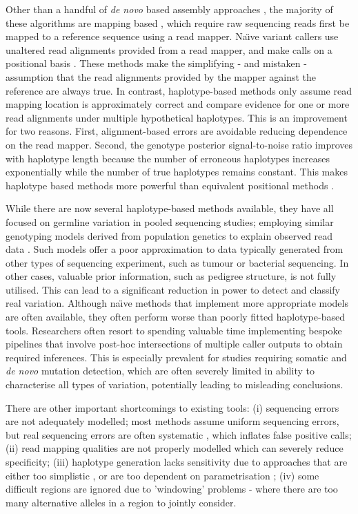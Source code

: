 \documentclass[notitlepage, twocolumn]{article}
\begin{document}
Other than a handful of \emph{de novo} based assembly approaches \cite{cortex}, the majority of these algorithms are mapping based \cite{gatk, freebayes, platypus}, which require raw sequencing reads first be mapped to a reference sequence using a read mapper. Na\"\i ve variant callers use unaltered read alignments provided from a read mapper, and make calls on a positional basis \cite{samtools}. These methods make the simplifying - and mistaken - assumption that the read alignments provided by the mapper against the reference are always true. In contrast, haplotype-based methods only assume read mapping location is approximately correct and compare evidence for one or more read alignments under multiple hypothetical haplotypes. This is an improvement for two reasons. First, alignment-based errors are avoidable reducing dependence on the read mapper. Second, the genotype posterior signal-to-noise ratio improves with haplotype length because the number of erroneous haplotypes increases exponentially while the number of true haplotypes remains constant. This makes haplotype based methods more powerful than equivalent positional methods \cite{haplotype-calling}.

While there are now several haplotype-based methods available, they have all focused on germline variation in pooled sequencing studies; employing similar genotyping models derived from population genetics to explain observed read data \cite{gatk, freebayes, platypus}. Such models offer a poor approximation to data typically generated from other types of sequencing experiment, such as tumour or bacterial sequencing. In other cases, valuable prior information, such as pedigree structure, is not fully utilised. This can lead to a significant reduction in power to detect and classify real variation. Although na\"\i ve methods that implement more appropriate models are often available, they often perform worse than poorly fitted haplotype-based tools. Researchers often resort to spending valuable time implementing bespoke pipelines that involve post-hoc intersections of multiple caller outputs to obtain required inferences. This is especially prevalent for studies requiring somatic and \emph{de novo} mutation detection, which are often severely limited in ability to characterise all types of variation, potentially leading to misleading conclusions.

There are other important shortcomings to existing tools: (i) sequencing errors are not adequately modelled; most methods \cite{freebayes, gatk} assume uniform sequencing errors, but real sequencing errors are often systematic \cite{illumina-error}, which inflates false positive calls; (ii) read mapping qualities \cite{maq} are not properly modelled which can severely reduce specificity; (iii) haplotype generation lacks sensitivity due to approaches that are either too simplistic \cite{freebayes}, or are too dependent on parametrisation \cite{gatk}; (iv) some difficult regions are ignored due to 'windowing' problems - where there are too many alternative alleles in a region to jointly consider.
\end{document}
